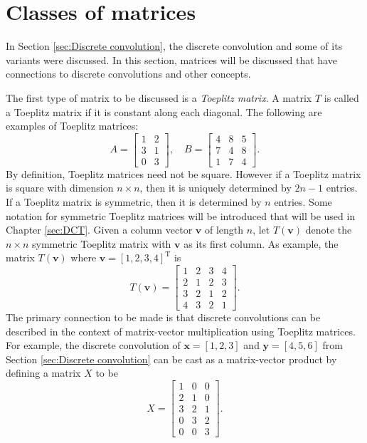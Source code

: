 \documentclass[12pt]{book}
\newcommand{\trans}{\mathrm{T}}	%
\begin{document}
\section{Classes of matrices} \label{sec:Classes of matrices}
In Section \ref{sec:Discrete convolution}, the discrete convolution and some of its variants were discussed. In this section, matrices will be discussed that have connections to discrete convolutions and other concepts. \par 
The first type of matrix to be discussed is a \textit{Toeplitz matrix}. A matrix $T$ is called a Toeplitz matrix if it is constant along each diagonal. The following are examples of Toeplitz matrices:
\[A = \begin{bmatrix}
1 & 2 \\
3 & 1 \\
0 & 3
\end{bmatrix}, \quad 
B = \begin{bmatrix}
4 & 8 & 5 \\
7 & 4 & 8 \\
1 & 7 & 4
\end{bmatrix}.\]
By definition, Toeplitz matrices need not be square. However if a Toeplitz matrix is square with dimension $n \times n$, then it is uniquely determined by $2n-1$ entries. If a Toeplitz matrix is symmetric, then it is determined by $n$ entries. Some notation for symmetric Toeplitz matrices will be introduced that will be used in Chapter \ref{sec:DCT}. Given a column vector $\mathbf{v}$ of length $n$, let $T(\mathbf{v})$ denote the $n \times n$ symmetric Toeplitz matrix with $\mathbf{v}$ as its first column. As example, the matrix $T(\mathbf{v})$ where $\mathbf{v} = [1,2,3,4]^\trans$ is
\[T(\mathbf{v}) = \begin{bmatrix}
1 & 2 & 3 & 4 \\
2 & 1 & 2 & 3 \\
3 & 2 & 1 & 2 \\
4 & 3 & 2 & 1 
\end{bmatrix}.\] 
The primary connection to be made is that discrete convolutions can be described in the context of matrix-vector multiplication using Toeplitz matrices. For example, the discrete convolution of $\mathbf{x} = [1,2,3]$ and $\mathbf{y} = [4,5,6]$ from Section \ref{sec:Discrete convolution} can be cast as a matrix-vector product by defining a matrix $X$ to be
\[X = \begin{bmatrix}
1 & 0 & 0  \\
2 & 1 & 0 \\
3 & 2 & 1 \\
0 & 3 & 2 \\
0 & 0 & 3 
\end{bmatrix}.\]
\end{document}
